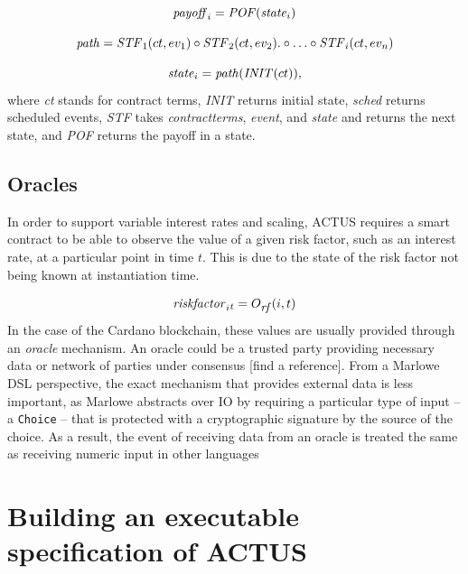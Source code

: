 \documentclass[runningheads]{llncs}
\newcommand{\ident}[1]{\mbox{\emph{#1}}}
\begin{document}
\noindent 
\begin{equation}
\ident{payoff}_{i}=\ident{POF}(\ident{state}_{i})
\end{equation}

\newcommand{\STF}{\ident{STF}}
\noindent 
\begin{equation}
\ident{path}=\STF_{1}(ct,ev_{1})\circ \STF_{2}(ct,ev_{2}).\circ\ldots\circ \STF_{i}(ct,ev_{n})
\end{equation}

\noindent 
\begin{equation}
\ident{state}_{i}=\ident{path}(\ident{INIT}(ct)),
\end{equation}
\noindent
where \emph{ct} stands for contract terms, \emph{INIT} returns initial state, \emph{sched}
returns scheduled events, \emph{STF} takes \emph{contractterms}, \emph{event}, and \emph{state}
and returns the next state, and \emph{POF} returns the payoff in a state.

\subsection{Oracles}

In order to support variable interest rates and scaling, ACTUS requires
a smart contract to be able to observe the value of a given risk factor,
such as an interest rate, at a particular point in time $t$. This is due to the state of the risk factor not being known at instantiation
time. 

\noindent 
\begin{equation}
\ident{riskfactor}_{i}{}_{t}=O_{\footnotesize\ident{rf}}(i,t)
\end{equation}
\noindent
In the case of the Cardano blockchain, these values are usually
provided through an \emph{oracle} mechanism\cite{oracles}. An oracle
could be a trusted party providing necessary data or network of parties
under consensus {[}find a reference{]}. 
From a Marlowe DSL perspective,
the exact mechanism that provides external data is less important,
as Marlowe abstracts over IO by requiring a particular type of input -- a 
\texttt{Choice} -- that is protected with a cryptographic signature by the source of the choice.
As a result, the event of receiving data from an oracle is treated the
same as receiving numeric input in other languages

\section{Building an executable specification of ACTUS}
\label{executable}
\end{document}
